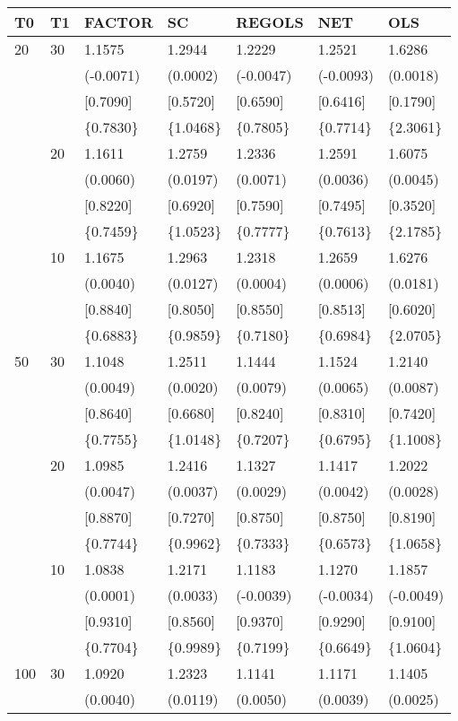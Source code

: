 \begin{table}[ht]
\centering
\begin{tabular}{lllllll}
\hline
T0&T1&FACTOR&SC&REGOLS&NET&OLS\\
\hline
20&30&1.1575&1.2944&1.2229&1.2521&1.6286\\
&&(-0.0071)&(0.0002)&(-0.0047)&(-0.0093)&(0.0018)\\
&&[0.7090]&[0.5720]&[0.6590]&[0.6416]&[0.1790]\\
&&\{0.7830\}&\{1.0468\}&\{0.7805\}&\{0.7714\}&\{2.3061\}\\
&20&1.1611&1.2759&1.2336&1.2591&1.6075\\
&&(0.0060)&(0.0197)&(0.0071)&(0.0036)&(0.0045)\\
&&[0.8220]&[0.6920]&[0.7590]&[0.7495]&[0.3520]\\
&&\{0.7459\}&\{1.0523\}&\{0.7777\}&\{0.7613\}&\{2.1785\}\\
&10&1.1675&1.2963&1.2318&1.2659&1.6276\\
&&(0.0040)&(0.0127)&(0.0004)&(0.0006)&(0.0181)\\
&&[0.8840]&[0.8050]&[0.8550]&[0.8513]&[0.6020]\\
&&\{0.6883\}&\{0.9859\}&\{0.7180\}&\{0.6984\}&\{2.0705\}\\
50&30&1.1048&1.2511&1.1444&1.1524&1.2140\\
&&(0.0049)&(0.0020)&(0.0079)&(0.0065)&(0.0087)\\
&&[0.8640]&[0.6680]&[0.8240]&[0.8310]&[0.7420]\\
&&\{0.7755\}&\{1.0148\}&\{0.7207\}&\{0.6795\}&\{1.1008\}\\
&20&1.0985&1.2416&1.1327&1.1417&1.2022\\
&&(0.0047)&(0.0037)&(0.0029)&(0.0042)&(0.0028)\\
&&[0.8870]&[0.7270]&[0.8750]&[0.8750]&[0.8190]\\
&&\{0.7744\}&\{0.9962\}&\{0.7333\}&\{0.6573\}&\{1.0658\}\\
&10&1.0838&1.2171&1.1183&1.1270&1.1857\\
&&(0.0001)&(0.0033)&(-0.0039)&(-0.0034)&(-0.0049)\\
&&[0.9310]&[0.8560]&[0.9370]&[0.9290]&[0.9100]\\
&&\{0.7704\}&\{0.9989\}&\{0.7199\}&\{0.6649\}&\{1.0604\}\\
100&30&1.0920&1.2323&1.1141&1.1171&1.1405\\
&&(0.0040)&(0.0119)&(0.0050)&(0.0039)&(0.0025)\\

\end{tabular}
\end{table}
